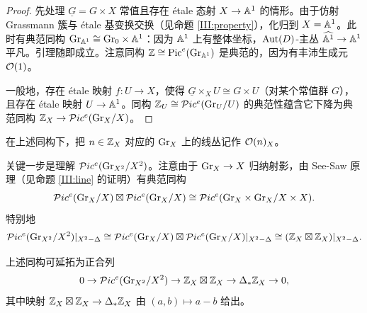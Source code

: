 \begin{proof}
先处理 $\underline G=G\times X$ 常值且存在 \'etale 态射 $X\to \bA^1$ 的情形。由于仿射 Grassmann 簇与 \'etale 基变换交换（见命题 \ref{III:property}），化归到 $X=\bA^1$。此时有典范同构 $\Gr_{\bA^1}\cong \Gr_0\times {\bA^1}$：因为 $\bA^1$ 上有整体坐标，$\Aut(D)$-主丛 $\widehat{\bA^1}\to \bA^1$ 平凡。引理随即成立。注意同构 $\bZ\cong \Pic^e(\Gr_{\bA^1})$ 是典范的，因为有丰沛生成元 $\mO(1)$。

一般地，存在 \'etale 映射 $f:U\to X$，使得 $\underline G\times_XU\cong G\times U$（对某个常值群 $G$），且存在 \'etale 映射 $U\to \bA^1$。同构 $\bZ_U\cong \mP ic^e(\Gr_U/U)$ 的典范性蕴含它下降为典范同构 $\bZ_X\to \mP ic^e(\Gr_X/X)$。
\end{proof}

在上述同构下，把 $n\in \bZ_X$ 对应的 $\Gr_X$ 上的线丛记作 $\mO(n)_X$。

关键一步是理解 $\mP ic^e(\Gr_{X^2}/X^2)$。注意由于 $\Gr_X\to X$ 归纳射影，由 See-Saw 原理（见命题 \ref{III:line} 的证明）有典范同构
\[ \mP ic^e(\Gr_X/X)\boxtimes \mP ic^e(\Gr_X/X)\cong\mP ic^e(\Gr_X\times\Gr_X/X\times X).\]
特别地
\[\mP ic^e(\Gr_{X^2}/X^2)|_{X^2-\Delta}\cong \mP ic^e(\Gr_X/X)\boxtimes \mP ic^e(\Gr_X/X)|_{X^2-\Delta}\cong(\bZ_X\boxtimes\bZ_X)|_{X^2-\Delta}.\]

\begin{lem}\label{Pic X2}
上述同构可延拓为正合列
\[0\to \mP ic^e(\Gr_{X^2}/X^2)\to \bZ_X\boxtimes\bZ_X\to \Delta_*\bZ_X\to 0, \]
其中映射 $\bZ_X\boxtimes\bZ_X\to \Delta_*\bZ_X$ 由 $(a,b)\mapsto a-b$ 给出。
\end{lem}

